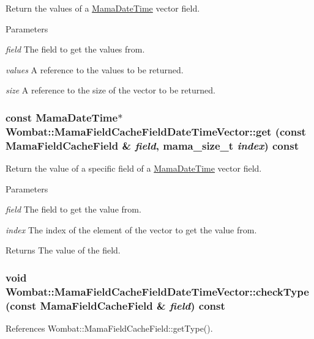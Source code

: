 Return the values of a \hyperlink{classWombat_1_1MamaDateTime}{MamaDateTime} vector field. 
\begin{DoxyParams}{Parameters}
\item[{\em field}]The field to get the values from. \item[{\em values}]A reference to the values to be returned. \item[{\em size}]A reference to the size of the vector to be returned. \end{DoxyParams}
\hypertarget{classWombat_1_1MamaFieldCacheFieldDateTimeVector_aa76d3e79b75038d208d33d9d17519f8c}{
\subsubsection[{get}]{\setlength{\rightskip}{0pt plus 5cm}const {\bf MamaDateTime}$\ast$ Wombat::MamaFieldCacheFieldDateTimeVector::get (const {\bf MamaFieldCacheField} \& {\em field}, \/  {\bf mama\_\-size\_\-t} {\em index}) const}}
\label{classWombat_1_1MamaFieldCacheFieldDateTimeVector_aa76d3e79b75038d208d33d9d17519f8c}


Return the value of a specific field of a \hyperlink{classWombat_1_1MamaDateTime}{MamaDateTime} vector field. 
\begin{DoxyParams}{Parameters}
\item[{\em field}]The field to get the value from. \item[{\em index}]The index of the element of the vector to get the value from. \end{DoxyParams}
\begin{DoxyReturn}{Returns}
The value of the field. 
\end{DoxyReturn}
\hypertarget{classWombat_1_1MamaFieldCacheFieldDateTimeVector_a3032d98deb67dbb3a1bb8c4599ee48b5}{
\subsubsection[{checkType}]{\setlength{\rightskip}{0pt plus 5cm}void Wombat::MamaFieldCacheFieldDateTimeVector::checkType (const {\bf MamaFieldCacheField} \& {\em field}) const}}
\label{classWombat_1_1MamaFieldCacheFieldDateTimeVector_a3032d98deb67dbb3a1bb8c4599ee48b5}


References Wombat::MamaFieldCacheField::getType().